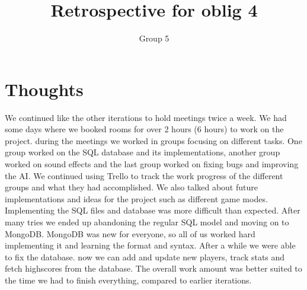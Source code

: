 \documentclass{article}
\title{Retrospective for oblig 4}
\author{Group 5}
\date{}
\begin{document}
    \maketitle

    \section{Thoughts}
    \noindent
     We continued like the other iterations to hold meetings twice a week. We had some days where we booked rooms for over 2 hours (6 hours) to work on the project.
     during the meetings we worked in groups focusing on different tasks. One group worked on the SQL database and its implementations, another group worked on sound effects
     and the last group worked on fixing bugs and improving the AI. We continued using Trello to track the work progress of the different groups and what they had accomplished.
     We also talked about future implementations and ideas for the project such as different game modes.
     Implementing the SQL files and database was more difficult than expected.
     After many tries we ended up abandoning the regular SQL model and moving on to MongoDB. MongoDB was new for everyone, so all of us worked hard
     implementing it and learning the format and syntax. After a while we were able to fix the database. now we can add and update new players, track
     stats and fetch highscores from the database. The overall work amount was better suited to the time we had to finish everything, compared to earlier iterations.
\end{document}
